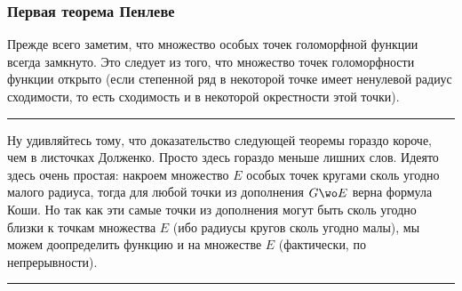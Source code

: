 \documentclass[a4paper]{article}
\newenvironment{petit}
{\par \smallskip \hrule \smallskip \footnotesize}
{\par \smallskip \hrule \smallskip}
\begin{document}
\subsubsection{Первая теорема Пенлеве}

Прежде всего заметим, что множество особых точек голоморфной функции всегда  замкнуто.
Это следует из того, что множество точек голоморфности функции открыто (если степенной ряд в некоторой точке
имеет ненулевой радиус сходимости, то есть сходимость и в некоторой окрестности этой точки).

\begin{petit}
Ну удивляйтесь тому, что доказательство следующей теоремы гораздо короче, чем в листочках Долженко.
Просто здесь гораздо меньше лишних слов. Идея\д то здесь очень простая: накроем множество $E$ особых точек
кругами сколь угодно малого радиуса, тогда для любой точки из дополнения $G\wo E$ верна формула Коши. Но так как
эти самые точки из дополнения могут быть сколь угодно близки к точкам множества $E$ (ибо радиусы кругов сколь угодно малы),
мы можем доопределить функцию и на множестве $E$ (фактически, по непрерывности).
\end{petit}
\end{document}

